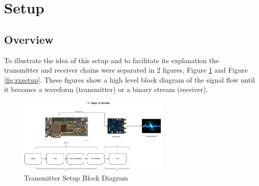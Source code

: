 \section{Setup}
\label{impl:setup}

\subsection{Overview}

%
%
%

To illustrate the idea of this setup and to facilitate its explanation the
transmitter and receiver chains were separated in 2 figures, Figure
\ref{fig:txsetup} and Figure \ref{fig:rxsetup}. These figures show a high level
block diagram of the signal flow until it becomes a waveform (transmitter) or a
binary stream (receiver).

\begin{figure}[htbp]
    \centering
    \includegraphics[width=0.65\textwidth]{./figures/tx_setup}
    \caption{ Transmitter Setup Block Diagram
    \label{fig:txsetup}}
\end{figure}

